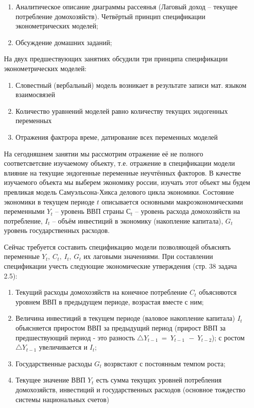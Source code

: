 \documentclass[12pt,a4paper]{article}
\author{GH-TIMe}
\begin{document}
\begin{enumerate}
\item Аналитическое описание диаграммы рассеянья (Лаговый доход -- текущее потребление домохозяйств). Четвёртый принцип спецификации эконометрических моделей;
\item Обсуждение домашних заданий;
\end{enumerate}

На двух предшествующих занятиях обсудили три принципа спецификации эконометрических моделей:
\begin{enumerate}
\item Словестный (вербальный) модель возникает в результате записи мат. языком взаимосвязей
\item Количество уравнений моделей равно количеству текущих эндогенных переменных
\item Отражения фактрора време, датирование всех переменных моделей
\end{enumerate}

На сегодняшнем занятии мы рассмотрим отражение её не полного соответсветсвие изучаемому объекту, т.е. отражение в спецификации модели влияние на текущие эндогенные переменные неучтённых факторов. В качестве изучаемого объекта мы выберем экономику россии, изучать этот объект мы будем превликая модель Самуэльсона-Хикса делового цикла экономики. Состояние экономики в текущем периоде $t$ описывается основными макроэкономическими переменными $Y_t$ -- уровень ВВП страны $С_t$ -- уровень расхода домохозяйств на потребление, $I_t$ -- объём инвестиций в экономику (накопление капитала), $G_t$ уровень государственных расходов.

Сейчас требуется составить спецификацию модели позволяющей объяснять переменные $\displaystyle Y_{t} ,\ C_{t} ,\ I_{t} ,\ G_{t}$ их лаговыми значениями. При составлении спецификации учесть следующие экономические утверждения (стр. 38 задача 2.5):
\begin{enumerate}
\item Текущий расходы домохозяйств на конечное потребление $\displaystyle C_{t}$ объясняются уровнем ВВП в предыдущем периоде, возрастая вместе с ним;
\item Величина инвестиций в текущем периоде (валовое накопление капитала) $\displaystyle I_{t}$объясняется приростом ВВП за предыдущий период (прирост ВВП за предшествующий период - это разность $\displaystyle \triangle Y_{t-1} \ =\ Y_{t-1\ } \ -\ Y_{t-2}$); с ростом $\displaystyle \triangle Y_{t-1}$ увеличивается и $\displaystyle I_{t}$;
\item Государственные расходы $\displaystyle G_{t}$ возрвстают с постоянным темпом роста;
\item Текущее значение ВВП $\displaystyle Y_{t}$ есть сумма текущих уровней потребления домохозяйств, инвестиций и государственных расходов (основное тождество системы национальных счетов)
\end{enumerate}
\end{document}
